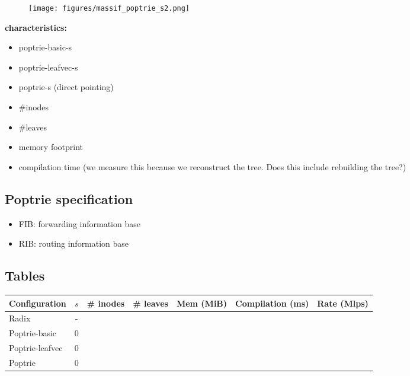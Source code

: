 \documentclass{article}
\begin{document}
\begin{figure}
\begin{center}
    \texttt{[image: figures/massif\_poptrie\_s2.png]}
\end{center}
\end{figure}
\textbf{characteristics:}
\begin{itemize}
    \item poptrie-basic-s
    \item poptrie-leafvec-s
    \item poptrie-s (direct pointing)
    \item \#inodes
    \item \#leaves
    \item memory footprint
    \item compilation time (we measure this because
    we reconstruct the tree. Does this include rebuilding the tree?)
\end{itemize}

\subsection{Poptrie specification}
\begin{itemize}
    \item FIB: forwarding information base
    \item RIB: routing information base
\end{itemize}

\subsection{Tables}
\begin{center}
    \begin{tabular}{|l|c|c|c|c|c|c|}
        \hline
        Configuration   & $s$ & \# inodes & \# leaves & Mem (MiB) & Compilation (ms) & Rate (Mlps) \\ 
        \hline
        Radix           & -   & & & & & \\ 
        \hline                           
        Poptrie-basic   & $0$ & & & & & \\  
        \hline                           
        Poptrie-leafvec & $0$ & & & & & \\
        \hline
        Poptrie         & $0$ & & & & & \\
        \hline
    \end{tabular}
\end{center}
\end{document}
